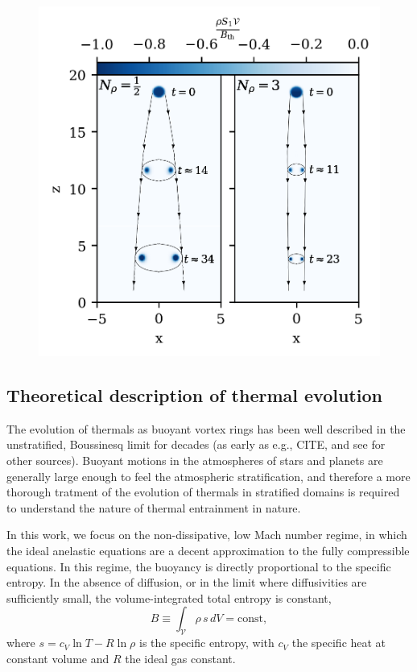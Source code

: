 \documentclass[twocolumn, amsmath, amsfonts, amssymb, trackchanges]{aastex62}
\begin{document}
\begin{figure}[t!]
    \includegraphics[width=\textwidth]{evolution_colormeshes.png}
    \caption{
    \label{fig:evolution_colormeshes} }
\end{figure}


\subsection{Theoretical description of thermal evolution}
The evolution of thermals as buoyant vortex rings has been well described in
the unstratified, Boussinesq limit for decades (as early as e.g., CITE, and
see \citet{lecoanet&jeevanjee2018} for other sources). Buoyant motions 
in the atmospheres of stars and planets are generally large enough to feel the
atmospheric stratification, and therefore a more thorough tratment of the
evolution of thermals in stratified domains is required to understand the nature
of thermal entrainment in nature.

In this work, we focus on the non-dissipative, low Mach number regime, 
in which the ideal anelastic equations are a decent approximation to the fully
compressible equations. In this regime, the buoyancy is directly proportional to the
specific entropy. In the absence of diffusion, or in the limit where diffusivities
are sufficiently small, the volume-integrated total entropy is constant,
\begin{equation}
B \equiv \int_{\mathcal{V}} \rho\, s\, dV = \text{const},
\end{equation}
where $s = c_V \ln T - R \ln\rho$ is the specific entropy, with $c_V$ the
specific heat at constant volume and $R$ the ideal gas constant.
\end{document}

